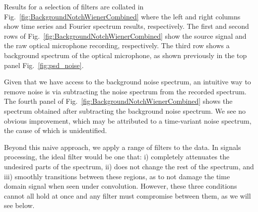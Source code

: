\documentclass[paper-main.tex]{subfiles}
\begin{document}

Results for a selection of filters are collated in Fig.~\ref{fig:BackgroundNotchWienerCombined} where the left and right columns show time series and Fourier spectrum results, respectively. 
The first and second rows of Fig.~\ref{fig:BackgroundNotchWienerCombined} show the source signal and the raw optical microphone recording, respectively. 
The third row shows a background spectrum of the optical microphone, as shown previously in the top panel Fig.~\ref{fig:psd_noise}.


Given that we have access to the background noise spectrum, an intuitive way to remove noise is via subtracting the noise spectrum from the recorded spectrum. 
The fourth panel of Fig.~\ref{fig:BackgroundNotchWienerCombined} shows the spectrum obtained after subtracting the background noise spectrum. 
We see no obvious improvement, which may be attributed to a time-variant noise spectrum, the cause of which is unidentified. %


Beyond this naive approach, we apply a range of filters to the data.
In signals processing, the ideal filter would be one that:
i) completely attenuates the undesired parts of the spectrum, 
ii) does not change the rest of the spectrum, and 
iii) smoothly transitions between these regions, as to not damage the time domain signal when seen under convolution. 
However, these three conditions cannot all hold at once and any filter must compromise between them, as we will see below. 
\end{document}
